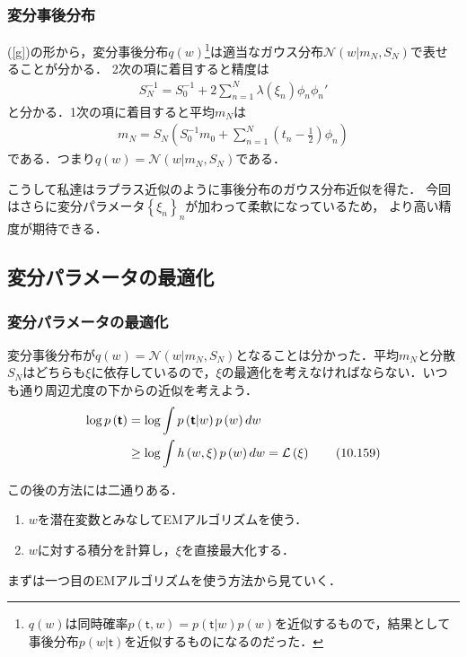 \documentclass[10pt,usepdftitle=false,hyperref={unicode}]{beamer}
\newcommand{\paref}[1]{{\fontfamily{cmr}\selectfont (\ref{#1})}}
\newcommand{\parentheses}[1]{\left(#1\right)}
\newcommand{\braces}[1]{\left\{#1\right\}}
\newcommand{\energy}{\mathcal{L}}
\begin{document}
\begin{frame}
\frametitle{変分事後分布}
\paref{g}の形から，変分事後分布$q\parentheses{w}$\footnote[frame]{$q\parentheses{w}$は同時確率$p\parentheses{\bm{\mathsf{t}},w} = p\parentheses{\bm{\mathsf{t}}|w}p\parentheses{w}$を近似するもので，結果として事後分布$p\parentheses{w|\bm{\mathsf{t}}}$を近似するものになるのだった．}は適当なガウス分布$\mathcal{N}\parentheses{w|m_N,S_N}$で表せることが分かる．
2次の項に着目すると精度は
\begin{align*}
    S_N^{-1} = S_0^{-1} + 2 \sum_{n = 1}^N \lambda\parentheses{\xi_n} \phi_n \phi_n'
\end{align*}
と分かる．1次の項に着目すると平均$m_N$は
\begin{align*}
    m_N = S_N\parentheses{S_0^{-1}m_0 + \sum_{n = 1}^N \parentheses{t_n - \frac{1}{2}}\phi_n}
\end{align*}
である．つまり$q\parentheses{w} = \mathcal{N}\parentheses{w|m_N,S_N}$である．

\bigskip

こうして私達はラプラス近似のように事後分布のガウス分布近似を得た．
今回はさらに変分パラメータ$\braces{\xi_n}_n$が加わって柔軟になっているため，
より高い精度が期待できる．
\end{frame}

\subsection{変分パラメータの最適化}
\begin{frame}
\frametitle{変分パラメータの最適化}
変分事後分布が$q\parentheses{w} = \mathcal{N}\parentheses{w|m_N,S_N}$となることは分かった．平均$m_N$と分散$S_N$はどちらも$\xi$に依存しているので，$\xi$の最適化を考えなければならない．いつも通り周辺尤度の下からの近似を考えよう．
\begin{align}
    \log p\parentheses{\bm{\mathsf{t}}}
    &= \log \int p\parentheses{\bm{\mathsf{t}}|w}p\parentheses{w}dw \notag \\
    &\geq \log \int h\parentheses{w,\xi}p\parentheses{w}dw = \energy\parentheses{\xi} \tag{10.159}
\end{align}

\bigskip

この後の方法には二通りある．
\begin{enumerate}
    \item $w$を潜在変数とみなしてEMアルゴリズムを使う．
    \item $w$に対する積分を計算し，$\xi$を直接最大化する．
\end{enumerate}

\bigskip

まずは一つ目のEMアルゴリズムを使う方法から見ていく．
\end{frame}
\end{document}

